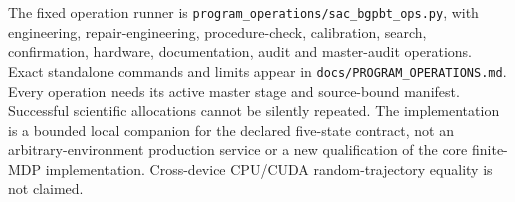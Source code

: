 The fixed operation runner is \texttt{program\_operations/sac\_bgpbt\_ops.py},
with engineering, repair-engineering, procedure-check, calibration, search, confirmation, hardware, documentation,
audit and master-audit operations. Exact standalone commands and limits appear
in \texttt{docs/PROGRAM\_OPERATIONS.md}. Every operation needs its active master
stage and source-bound manifest. Successful scientific allocations cannot be
silently repeated. The implementation is a bounded local companion for the
declared five-state contract, not an arbitrary-environment production service
or a new qualification of the core finite-MDP implementation. Cross-device
CPU/CUDA random-trajectory equality is not claimed.
